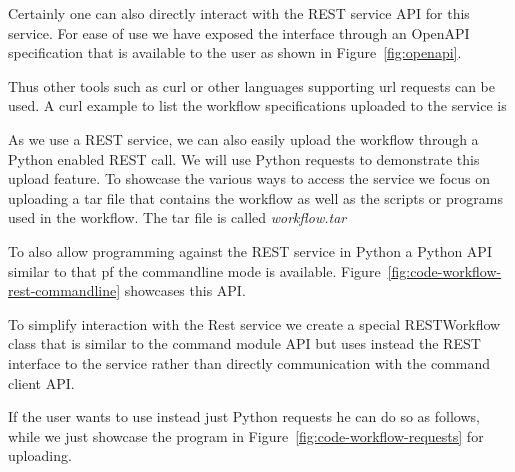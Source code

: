 Certainly one can also directly interact with the REST service API for
this service. For ease of use we have exposed the interface through
an OpenAPI specification that is available to the user as shown in
Figure~\ref{fig:openapi}.



Thus other tools such as curl or other languages supporting url
requests can be used. A curl example to list the workflow
specifications uploaded to the service is

As we use a REST service, we can also easily upload the workflow
through a Python enabled REST call. We will use Python requests to
demonstrate this upload feature. To showcase the various ways to
access the service we focus on uploading a tar file that contains the workflow as well as the scripts or programs used in the workflow. The tar file is called {\em workflow.tar}

To also allow programming against the REST service in Python a Python
API similar to that pf the commandline mode is
available. Figure~\ref{fig:code-workflow-rest-commandline} showcases
this API.

To simplify interaction with the Rest service we create a special
RESTWorkflow class that is similar to the command module API but uses
instead the REST interface to the service rather than directly
communication with the command client API.

If the user wants to use instead just Python requests he can do so as
follows, while we just showcase the program in
Figure~\ref{fig:code-workflow-requests} for uploading.

